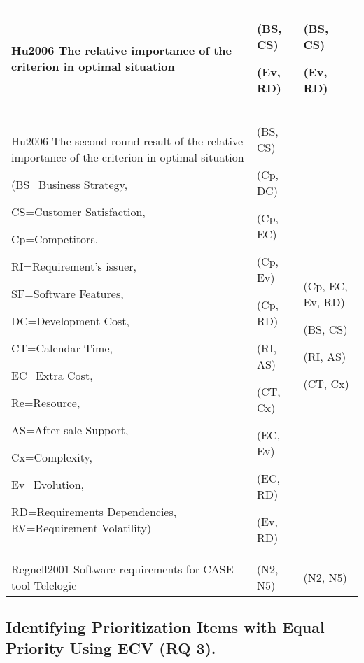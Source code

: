 \begin{table*}
\begin{tabular}{
|>{\centering}p{}
|>{\centering}p{}
|>{\centering}p{}|}
Hu2006 \cite{Hu2006} The relative importance of the criterion in optimal situation & (BS, CS) 

(Ev, RD) & (BS, CS) 

(Ev, RD)\tabularnewline
\hline 

Hu2006 \cite{Hu2006} The second round result of the relative importance of the criterion
in optimal situation

(BS=Business Strategy,

CS=Customer Satisfaction,

Cp=Competitors,

RI=Requirement's issuer,

SF=Software Features,

DC=Development Cost,

CT=Calendar Time,

EC=Extra Cost,

Re=Resource,

AS=After-sale Support,

Cx=Complexity,

Ev=Evolution,

RD=Requirements Dependencies, RV=Requirement Volatility) & (BS, CS)

(Cp, DC)

(Cp, EC)

(Cp, Ev) 

(Cp, RD)

(RI, AS) 

(CT, Cx) 

(EC, Ev) 

(EC, RD)

(Ev, RD) & (Cp, EC, Ev, RD)

(BS, CS)

(RI, AS) 

(CT, Cx) \tabularnewline
\hline 
Regnell2001 \cite{Regnell2001} Software requirements for CASE tool Telelogic & (N2, N5) & (N2, N5)\tabularnewline
\hline
\end{tabular}%
\end{table*}


\subsection{Identifying Prioritization Items with Equal Priority Using ECV (RQ 3).\label{rq3}}

